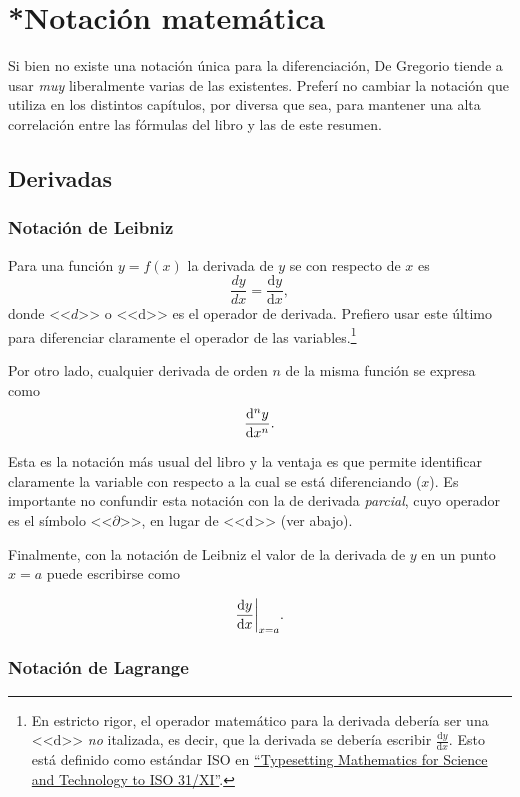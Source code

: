 \documentclass[DeGregorioResumen]{subfiles}
\begin{document}
\section*{*Notación matemática}
Si bien no existe una notación única para la diferenciación, De Gregorio tiende a usar \emph{muy} liberalmente varias de las existentes. Preferí no cambiar la notación que utiliza en los distintos capítulos, por diversa que sea, para mantener una alta correlación entre las fórmulas del libro y las de este resumen.

\subsection*{Derivadas}
\subsubsection*{Notación de Leibniz}

Para una función $y=f(x)$ la derivada de  $y$ se con respecto de $x$ es
\[
\frac{dy}{dx} = \frac{\mathrm{d}y}{\mathrm{d}x},
\]
donde <<$d$>> o <<$\mathrm{d}$>> es el operador de derivada. Prefiero usar este último para diferenciar claramente el operador de las variables.\footnote{En estricto rigor, el operador matemático para la derivada debería ser una <<$\mathrm{d}$>> \emph{no} italizada, es decir, que la derivada se debería escribir $\frac{\mathrm{d}y}{\mathrm{d}x}$. Esto está definido como estándar ISO en \href{http://www.tug.org/TUGboat/Articles/tb18-1/tb54becc.pdf}{``Typesetting Mathematics for Science and Technology to ISO 31/XI''}.}

Por otro lado, cualquier derivada de orden $n$ de la misma función se expresa como
\[
\frac{\mathrm{d}^ny}{\mathrm{d}x^n}.
\]

Esta es la notación más usual del libro y la ventaja es que permite identificar claramente la variable con respecto a la cual se está diferenciando ($x$). Es importante no confundir esta notación con la de derivada \emph{parcial}, cuyo operador es el símbolo <<$\partial$>>, en lugar de <<$\mathop{}\!\mathrm{d}$>> (ver abajo).

Finalmente, con la notación de Leibniz el valor de la derivada de $y$ en un punto $x=a$ puede escribirse como

\[
\frac{\mathrm{d}y}{\mathrm{d}x}\bigg|_{x=a}.
\]

\subsubsection*{Notación de Lagrange}
\end{document}

